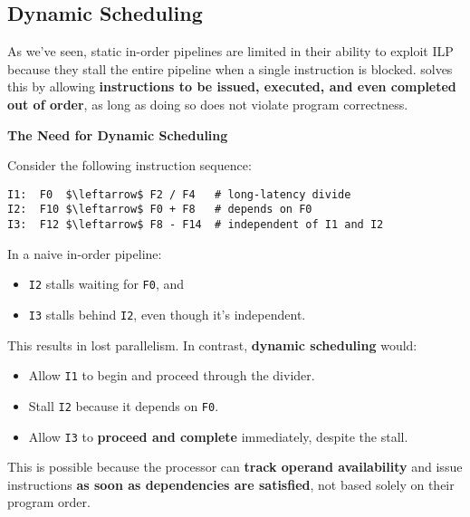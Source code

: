 \subsection{Dynamic Scheduling}

As we've seen, static in-order pipelines are limited in their ability to exploit ILP because they stall the entire pipeline when a single instruction is blocked.  solves this by allowing \textbf{instructions to be issued, executed, and even completed out of order}, as long as doing so does not violate program correctness.

\highspace
\begin{flushleft}
    \textcolor{Red2}{ \textbf{The Need for Dynamic Scheduling}}
\end{flushleft}
Consider the following instruction sequence:
\begin{lstlisting}[language=riscv, mathescape=true]
I1:  F0  $\leftarrow$ F2 / F4   # long-latency divide
I2:  F10 $\leftarrow$ F0 + F8   # depends on F0
I3:  F12 $\leftarrow$ F8 - F14  # independent of I1 and I2
\end{lstlisting}
In a naive in-order pipeline:
\begin{itemize}
    \item \texttt{I2} stalls waiting for \texttt{F0}, and
    \item \texttt{I3} stalls behind \texttt{I2}, even though it's independent.
\end{itemize}
This results in lost parallelism. In contrast, \textbf{dynamic scheduling} would:
\begin{itemize}
    \item Allow \texttt{I1} to begin and proceed through the divider.
    \item Stall \texttt{I2} because it depends on \texttt{F0}.
    \item Allow \texttt{I3} to \textbf{proceed and complete} immediately, despite the stall.
\end{itemize}
This is possible because the processor can \textbf{track operand availability} and issue instructions \textbf{as soon as dependencies are satisfied}, not based solely on their program order.

